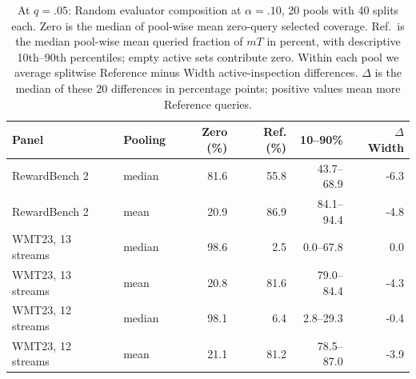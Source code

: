 \begin{table}[t]
\centering\small
\begin{tabular}{llrrrr}
\toprule
Panel & Pooling & Zero (\%) & Ref. (\%) & 10--90\% & $\Delta$ Width \\
\midrule
RewardBench 2 & median & 81.6 & 55.8 & 43.7--68.9 & -6.3 \\
RewardBench 2 & mean & 20.9 & 86.9 & 84.1--94.4 & -4.8 \\
WMT23, 13 streams & median & 98.6 & 2.5 & 0.0--67.8 & 0.0 \\
WMT23, 13 streams & mean & 20.8 & 81.6 & 79.0--84.4 & -4.3 \\
WMT23, 12 streams & median & 98.1 & 6.4 & 2.8--29.3 & -0.4 \\
WMT23, 12 streams & mean & 21.1 & 81.2 & 78.5--87.0 & -3.9 \\
\bottomrule
\end{tabular}
\caption{At $q=.05$: Random evaluator composition at $\alpha=.10$, 20 pools with 40 splits each. Zero is the median of pool-wise mean zero-query selected coverage. Ref.\ is the median pool-wise mean queried fraction of $mT$ in percent, with descriptive 10th--90th percentiles; empty active sets contribute zero. Within each pool we average splitwise Reference minus Width active-inspection differences. $\Delta$ is the median of these 20 differences in percentage points; positive values mean more Reference queries.}
\label{tab:review-composition}
\end{table}
